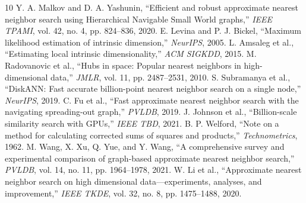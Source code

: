 \documentclass[conference,10pt]{IEEEtran}
\begin{document}
\begin{thebibliography}{10}
 Y. A. Malkov and D. A. Yashunin, ``Efficient and robust approximate nearest neighbor search using Hierarchical Navigable Small World graphs,'' \textit{IEEE TPAMI}, vol. 42, no. 4, pp. 824--836, 2020.
 E. Levina and P. J. Bickel, ``Maximum likelihood estimation of intrinsic dimension,'' \textit{NeurIPS}, 2005.
 L. Amsaleg et al., ``Estimating local intrinsic dimensionality,'' \textit{ACM SIGKDD}, 2015.
 M. Radovanovic et al., ``Hubs in space: Popular nearest neighbors in high-dimensional data,'' \textit{JMLR}, vol. 11, pp. 2487--2531, 2010.
 S. Subramanya et al., ``DiskANN: Fast accurate billion-point nearest neighbor search on a single node,'' \textit{NeurIPS}, 2019.
 C. Fu et al., ``Fast approximate nearest neighbor search with the navigating spreading-out graph,'' \textit{PVLDB}, 2019.
 J. Johnson et al., ``Billion-scale similarity search with GPUs,'' \textit{IEEE TBD}, 2021.
 B. P. Welford, ``Note on a method for calculating corrected sums of squares and products,'' \textit{Technometrics}, 1962.
 M. Wang, X. Xu, Q. Yue, and Y. Wang, ``A comprehensive survey and experimental comparison of graph-based approximate nearest neighbor search,'' \textit{PVLDB}, vol. 14, no. 11, pp. 1964--1978, 2021.
 W. Li et al., ``Approximate nearest neighbor search on high dimensional data---experiments, analyses, and improvement,'' \textit{IEEE TKDE}, vol. 32, no. 8, pp. 1475--1488, 2020.
\end{thebibliography}
\end{document}
